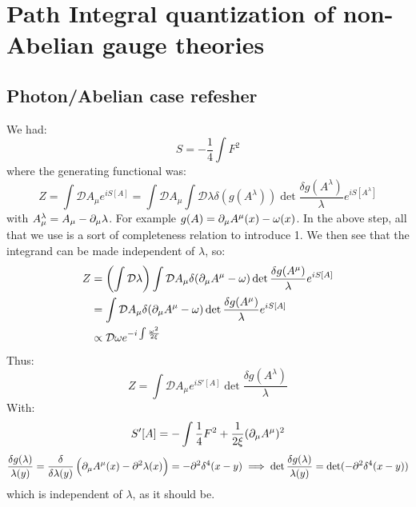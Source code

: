 \section{Path Integral quantization of non-Abelian gauge theories}

\subsection{Photon/Abelian case refesher}
We had:
\begin{equation}
    S = -\frac{1}{4}\int F^2
\end{equation}
where the generating functional was:
\begin{equation}
    Z = \int \mathcal{D}A_\mu e^{iS[A]} = \int \mathcal{D} A_\mu \int \mathcal{D}\lambda \delta(g(A^\lambda))\det\frac{\delta g(A^\lambda)}{\lambda} e^{iS[A^\lambda]}
\end{equation}
with $A^\lambda_\mu = A_\mu - \partial_\mu \lambda$. For example $g(A) = \partial_\mu A^\mu(x) - \omega(x)$. In the above step, all that we use is a sort of completeness relation to introduce 1. We then see that the integrand can be made independent of $\lambda$, so:
\begin{equation}
    \begin{split}
        Z &= \left(\int \mathcal{D} \lambda\right)\int \mathcal{D}A_\mu \delta(\partial_\mu A^\mu - \omega)\det \frac{\delta g(A^\mu)}{\lambda}e^{iS[A]}
        \\ &= \int \mathcal{D}A_\mu \delta(\partial_\mu A^\mu - \omega)\det \frac{\delta g(A^\mu)}{\lambda}e^{iS[A]}
        \\ &\propto \mathcal{D}\omega e^{-i\int \frac{\omega^2}{2\xi}}
    \end{split}
\end{equation}
Thus:
\begin{equation}
    Z = \int \mathcal{D}A_\mu e^{iS'[A]}\det\frac{\delta g(A^\lambda)}{\lambda}
\end{equation}
With:
\begin{equation}
    S'[A] = -\int \frac{1}{4}F^2 + \frac{1}{2\xi}(\partial_\mu A^\mu)^2
\end{equation}
\begin{equation}
    \frac{\delta g(\lambda)}{\lambda(y)} = \frac{\delta}{\delta \lambda(y)}\left(\partial_\mu A^\mu(x) - \partial^2\lambda(x)\right) = -\partial^2\delta^4(x-y) \implies \det \frac{\delta g(\lambda)}{\lambda(y)} =  \det(-\partial^2\delta^4(x-y))
\end{equation}
which is independent of $\lambda$, as it should be.

